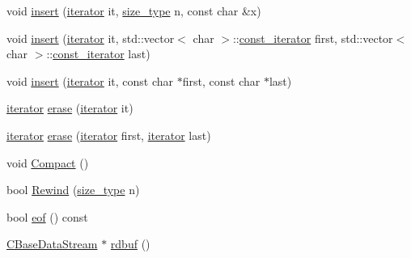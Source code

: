 \begin{DoxyCompactItemize}
\item 
void \mbox{\hyperlink{class_c_base_data_stream_a8f3b322d3e3a7e254f4a1a08cf3db187}{insert}} (\mbox{\hyperlink{class_c_base_data_stream_a23e0e0af1c68dd36c27162036b6d048d}{iterator}} it, \mbox{\hyperlink{class_c_base_data_stream_ad042ddea628c43357b9b13be89c71964}{size\+\_\+type}} n, const char \&x)
\item 
void \mbox{\hyperlink{class_c_base_data_stream_a57dd36b154277cc2997d9405bf514c3e}{insert}} (\mbox{\hyperlink{class_c_base_data_stream_a23e0e0af1c68dd36c27162036b6d048d}{iterator}} it, std\+::vector$<$ char $>$\+::\mbox{\hyperlink{class_c_base_data_stream_a9cf3080c5a75c94568980a59d3aab3ad}{const\+\_\+iterator}} first, std\+::vector$<$ char $>$\+::\mbox{\hyperlink{class_c_base_data_stream_a9cf3080c5a75c94568980a59d3aab3ad}{const\+\_\+iterator}} last)
\item 
void \mbox{\hyperlink{class_c_base_data_stream_a3e1588dfb94fb9845d56e1b0668e1ee4}{insert}} (\mbox{\hyperlink{class_c_base_data_stream_a23e0e0af1c68dd36c27162036b6d048d}{iterator}} it, const char $\ast$first, const char $\ast$last)
\item 
\mbox{\hyperlink{class_c_base_data_stream_a23e0e0af1c68dd36c27162036b6d048d}{iterator}} \mbox{\hyperlink{class_c_base_data_stream_ae381ee24932de8d08ebe13b4e1078e39}{erase}} (\mbox{\hyperlink{class_c_base_data_stream_a23e0e0af1c68dd36c27162036b6d048d}{iterator}} it)
\item 
\mbox{\hyperlink{class_c_base_data_stream_a23e0e0af1c68dd36c27162036b6d048d}{iterator}} \mbox{\hyperlink{class_c_base_data_stream_a0fb5434f391056c30493ccc39f7eeb24}{erase}} (\mbox{\hyperlink{class_c_base_data_stream_a23e0e0af1c68dd36c27162036b6d048d}{iterator}} first, \mbox{\hyperlink{class_c_base_data_stream_a23e0e0af1c68dd36c27162036b6d048d}{iterator}} last)
\item 
void \mbox{\hyperlink{class_c_base_data_stream_ab52dd7b6e1dce1fd90e1c9f9ad729ee6}{Compact}} ()
\item 
bool \mbox{\hyperlink{class_c_base_data_stream_ae93a5c7aa33f204030fd0a796a3b5f0f}{Rewind}} (\mbox{\hyperlink{class_c_base_data_stream_ad042ddea628c43357b9b13be89c71964}{size\+\_\+type}} n)
\item 
bool \mbox{\hyperlink{class_c_base_data_stream_a6501eb90892ec457cd99d48e5e658cfd}{eof}} () const
\item 
\mbox{\hyperlink{class_c_base_data_stream}{C\+Base\+Data\+Stream}} $\ast$ \mbox{\hyperlink{class_c_base_data_stream_a3ab78204837cf4f59a0a01bb22a6f043}{rdbuf}} ()
\item 

\end{DoxyCompactItemize}
